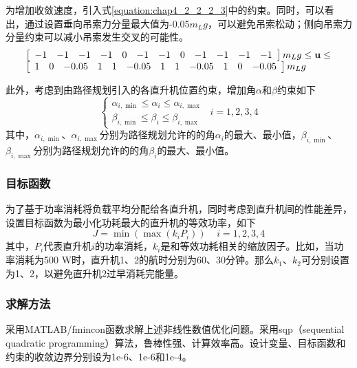 为增加收敛速度，引入式\ref{equation:chap4_2_2_2_3}中的约束。同时，可以看出，通过设置垂向吊索力分量最大值为-0.05$m_Lg$，可以避免吊索松动；侧向吊索力分量约束可以减小吊索发生交叉的可能性。
\begin{equation}
  \begin{array}{l}
      \left[ \begin{array}{*{20}{c}}
          - 1 & - 1 & - 1 & - 1 & 0 & -1 & - 1 & 0 & - 1 & - 1 &- 1 & - 1\\\end{array} 
          \right]{m_L}g \le {{\bf{u}}} \le\\
      \left[ \begin{array}{*{20}{c}}
          1 & 0 & - 0.05 & 1 & 1 & -0.05& 1 & 1 & -0.05 & 1 & 0 & -0.05\\\end{array} 
          \right]{m_L}g \\       
  \end{array}
  \label{equation:chap4_2_2_2_3}
\end{equation}

此外，考虑到由路径规划引入的各直升机位置约束，增加角$\alpha$和$\beta$约束如下
\begin{equation}
  \left\{ \begin{array}{l}
    {\alpha _{i,\min }} \le {\alpha _i} \le {\alpha _{i,\max }}\\
    {\beta _{i,\min }} \le {\beta _i} \le {\beta _{i,\max }}
    \end{array} \right. \ \ i = 1,2,3,4
\end{equation}
其中，${\alpha _{i,\min }}$、${\alpha _{i,\max }} $分别为路径规划允许的的角$\alpha_i$的最大、最小值，${\beta _{i,\min }}$、${\beta _{i,\max }}$分别为路径规划允许的的角$\beta_i$的最大、最小值。

\subsubsection{目标函数}
为了基于功率消耗将负载平均分配给各直升机，同时考虑到直升机间的性能差异，设置目标函数为最小化功耗最大的直升机的等效功率，如下
\begin{equation}
  J = \min \left( {\max \left( {{k _i}{P_i}} \right)} \right)\;\;\;\;i = 1,2,3,4
  \label{equation:chap_4_12}
\end{equation}
其中，$P_i$代表直升机$i$的功率消耗，$k_i$是和等效功耗相关的缩放因子。比如，当功率消耗为500 W时，直升机1、2的航时分别为60、30分钟。那么$k_1$、$k_2$可分别设置为1、2，以避免直升机2过早消耗完能量。
\subsubsection{求解方法}
采用MATLAB/fmincon函数求解上述非线性数值优化问题。采用sqp（sequential quadratic programming）算法，鲁棒性强、计算效率高。设计变量、目标函数和约束的收敛边界分别设为1e-6、1e-6和1e-4。

